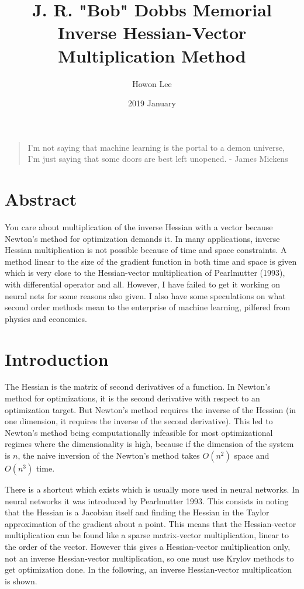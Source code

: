 \documentclass{article}
\begin{document}
\title{J. R. "Bob" Dobbs Memorial Inverse Hessian-Vector Multiplication Method}
\author{Howon Lee}
\date{2019 January}
\maketitle

\begin{quote}
I'm not saying that machine learning is the portal to a demon universe, I'm just saying that some doors are best left unopened. - James Mickens
\end{quote}

\section{Abstract}
You care about multiplication of the inverse Hessian with a vector because Newton's method for optimization demands it. In many applications, inverse Hessian multiplication is not possible because of time and space constraints. A method linear to the size of the gradient function in both time and space is given which is very close to the Hessian-vector multiplication of Pearlmutter (1993), with differential operator and all. However, I have failed to get it working on neural nets for some reasons also given. I also have some speculations on what second order methods mean to the enterprise of machine learning, pilfered from physics and economics.

\section{Introduction}

The Hessian is the matrix of second derivatives of a function. In Newton's method for optimizations, it is the second derivative with respect to an optimization target. But Newton's method requires the inverse of the Hessian (in one dimension, it requires the inverse of the second derivative). This led to Newton's method being computationally infeasible for most optimizational regimes where the dimensionality is high, because if the dimension of the system is $n$, the naive inversion of the Newton's method takes $O(n^2)$ space and $O(n^3)$ time.

There is a shortcut which exists which is usually more used in neural networks. In neural networks it was introduced by Pearlmutter 1993. This consists in noting that the Hessian is a Jacobian itself and finding the Hessian in the Taylor approximation of the gradient about a point. This means that the Hessian-vector multiplication can be found like a sparse matrix-vector multiplication, linear to the order of the vector. However this gives a Hessian-vector multiplication only, not an inverse Hessian-vector multiplication, so one must use Krylov methods to get optimization done. In the following, an inverse Hessian-vector multiplication is shown.
\end{document}
